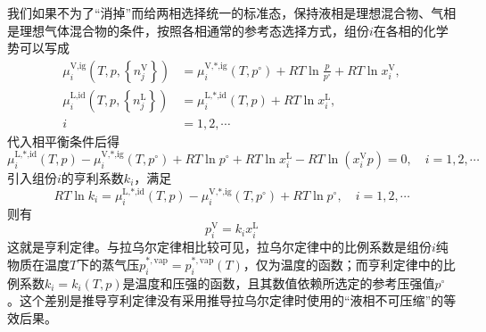 \documentclass[main.tex]{subfiles}
\begin{document}
我们如果不为了“消掉”而给两相选择统一的标准态，保持液相是理想混合物、气相是理想气体混合物的条件，按照各相通常的参考态选择方式，组份$i$在各相的化学势可以写成
\begin{align*}
    \mu_i^\text{V,ig}\left(T,p,\left\{n_j^\text{V}\right\}\right) & =\mu_i^\text{V,*,ig}\left(T,p^\circ\right)+RT\ln\frac{p}{p^\circ}+RT\ln x_i^\text{V}, \\
    \mu_i^\text{L,id}\left(T,p,\left\{n_j^\text{L}\right\}\right) & =\mu_i^\text{L,*,id}\left(T,p\right)+RT\ln x_i^\text{L},                              \\
    i                                                             & =1,2,\cdots
\end{align*}
代入相平衡条件后得
\[
    \mu_i^\text{L,*,id}\left(T,p\right)-\mu_i^\text{V,*,ig}\left(T,p^\circ\right)+RT\ln p^\circ+RT\ln x_i^\text{L}-RT\ln\left(x_i^\text{V}p\right)=0,\quad i=1,2,\cdots
\]
引入组份$i$的亨利系数$k_i$，满足
\[RT\ln k_i=\mu_i^\text{L,*,id}\left(T,p\right)-\mu_i^\text{V,*,ig}\left(T,p^\circ\right)+RT\ln p^\circ,\quad i=1,2,\cdots\]
则有
\[p_i^\text{V}=k_ix_i^\text{L}\]
这就是亨利定律。与拉乌尔定律相比较可见，拉乌尔定律中的比例系数是组份$i$纯物质在温度$T$下的蒸气压$p_i^{*,\text{vap}}=p_i^{*,\text{vap}}\left(T\right)$，仅为温度的函数；而亨利定律中的比例系数$k_i=k_i\left(T,p\right)$是温度和压强的函数，且其数值依赖所选定的参考压强值$p^\circ$。这个差别是推导亨利定律没有采用推导拉乌尔定律时使用的“液相不可压缩”的等效后果。
\end{document}
